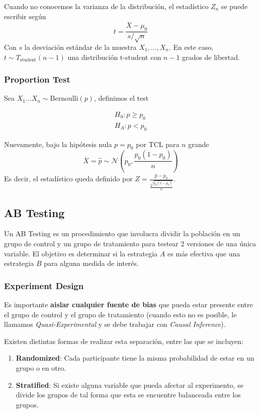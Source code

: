 Cuando no conocemos la varianza de la distribución, el estadístico $Z_n$ se puede escribir según 
$$ 
t = \frac{\overline{X} - \mu_0}{s / \sqrt{n}}
$$
Con $s$ la desviación estándar de la muestra $X_1 , \dots, X_n$. En este caso, $t \sim T_{\text{student}}(n-1)$ una distribución t-student con $n-1$ grados de libertad. 

\subsubsection{Proportion Test}

Sea $X_1 \dots X_n \sim \text{Bernoulli}(p)$, definimos el test 

\begin{equation*}
\begin{aligned}
    H_0: p \geq p_0 \\ 
    H_A: p < p_0
\end{aligned}
\end{equation*}

Nuevamente, bajo la hipótesis nula $p = p_0$ por TCL para $n$ grande
$$ 
\overline{X} = \hat{p} \sim \mathcal{N} \left ( p_0 , \frac{p_0(1-p_0)}{n} \right )
$$
Es decir, el estadístico queda definido por $Z = \frac{\hat{p} - p_0}{\frac{\sqrt{p_0(1-p_0)}}{n}}$. 

\subsection{AB Testing}

Un AB Testing es un procedimiento que involucra dividir la población en un grupo de control y un grupo de tratamiento para testear 2 versiones de una única variable. El objetivo es determinar si la estrategia $A$ es más efectiva que una estrategia $B$ para alguna medida de interés.

\subsubsection{Experiment Design}

Es importante \textbf{aislar cualquier fuente de bias} que pueda estar presente entre el grupo de control y el grupo de tratamiento (cuando esto no es posible, le llamamos \textit{Quasi-Experimental} y se debe trabajar con \textit{Causal Inference}). 

Existen distintas formas de realizar esta separación, entre las que se incluyen: 

\begin{enumerate}
    \item \textbf{Randomized}: Cada participante tiene la misma probabilidad de estar en un grupo o en otro. 
     \item \textbf{Stratified}: Si existe alguna variable que pueda afectar al experimento, se divide los grupos de tal forma que esta se encuentre balanceada entre los grupos. 
\end{enumerate}

